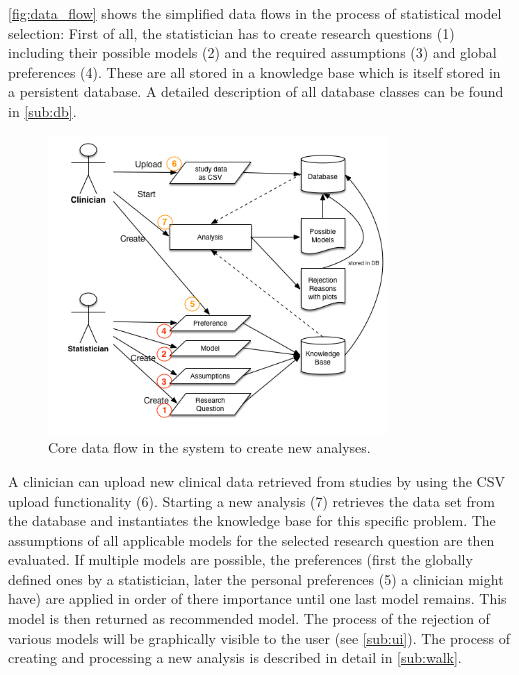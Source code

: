 \autoref{fig:data_flow} shows the simplified data flows in the process of statistical model selection: First of all, the statistician has to create research questions (1) including their possible models (2) and the required assumptions (3) and global preferences (4). These are all stored in a knowledge base which is itself stored in  a persistent database. A detailed description of all database classes can be found in \autoref{sub:db}. 

\begin{figure}[btph]
	\centering
	\includegraphics[width=0.8\textwidth]{figures/data_flow}
	\caption{Core data flow in the system to create new analyses.}
	\label{fig:data_flow}
\end{figure}


A clinician can upload new clinical data retrieved from studies by using the CSV upload functionality (6). Starting a new analysis (7) retrieves the data set from the database and instantiates the knowledge base for this specific problem. The assumptions of all applicable models for the selected research question are then evaluated. If multiple models are possible, the preferences (first the globally defined ones by a statistician, later the personal preferences (5) a clinician might have) are applied in order of there importance until one last model remains. This model is then returned as recommended model. The process of the rejection of various models will be graphically visible to the user (see \autoref{sub:ui}). The process of creating and processing a new analysis is described in detail in \autoref{sub:walk}.


